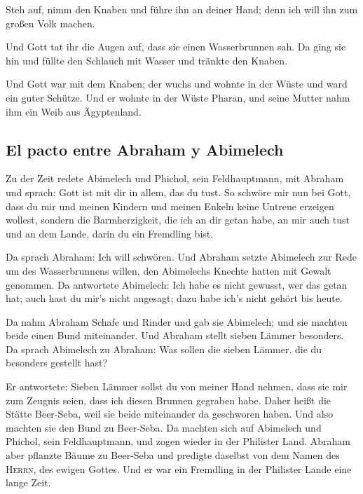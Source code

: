  Steh auf, nimm den Knaben und führe ihn an deiner Hand;
denn ich will ihn zum großen Volk machen.

 Und Gott tat ihr die Augen auf, dass sie einen
Wasserbrunnen sah. Da ging sie hin und füllte den Schlauch mit Wasser
und tränkte den Knaben.

 Und Gott war mit dem Knaben; der wuchs und wohnte in der
Wüste und ward ein guter Schütze.  Und er wohnte in der
Wüste Pharan, und seine Mutter nahm ihm ein Weib aus Ägyptenland.

\hypertarget{el-pacto-entre-abraham-y-abimelech}{%
\subsection{El pacto entre Abraham y
Abimelech}\label{el-pacto-entre-abraham-y-abimelech}}

 Zu der Zeit redete Abimelech und Phichol, sein
Feldhauptmann, mit Abraham und sprach: Gott ist mit dir in allem, das du
tust.  So schwöre mir nun bei Gott, dass du mir und
meinen Kindern und meinen Enkeln keine Untreue erzeigen wollest, sondern
die Barmherzigkeit, die ich an dir getan habe, an mir auch tust und an
dem Lande, darin du ein Fremdling bist.

 Da sprach Abraham: Ich will schwören. 
Und Abraham setzte Abimelech zur Rede um des Wasserbrunnens willen, den
Abimelechs Knechte hatten mit Gewalt genommen.  Da
antwortete Abimelech: Ich habe es nicht gewusst, wer das getan hat; auch
hast du mir's nicht angesagt; dazu habe ich's nicht gehört bis heute.

 Da nahm Abraham Schafe und Rinder und gab sie Abimelech;
und sie machten beide einen Bund miteinander.  Und
Abraham stellt sieben Lämmer besonders.  Da sprach
Abimelech zu Abraham: Was sollen die sieben Lämmer, die du besonders
gestellt hast?

 Er antwortete: Sieben Lämmer sollst du von meiner Hand
nehmen, dass sie mir zum Zeugnis seien, dass ich diesen Brunnen gegraben
habe.  Daher heißt die Stätte Beer-Seba, weil sie beide
miteinander da geschworen haben.  Und also machten sie
den Bund zu Beer-Seba. Da machten sich auf Abimelech und Phichol, sein
Feldhauptmann, und zogen wieder in der Philister Land. 
Abraham aber pflanzte Bäume zu Beer-Seba und predigte daselbst von dem
Namen des \textsc{Herrn}, des ewigen Gottes.  Und er war
ein Fremdling in der Philister Lande eine lange Zeit.

